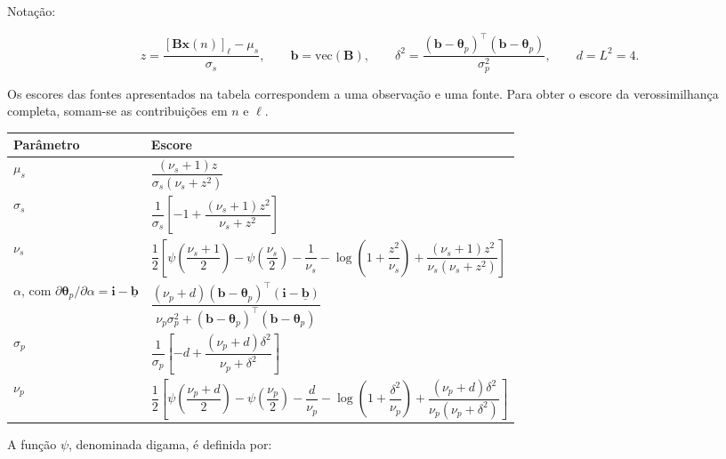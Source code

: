\documentclass[11pt]{article}
\newcounter{none}
\begin{document}
Notação:

\[z=\frac{[\mathbf B\mathbf x(n)]_\ell-\mu_s}{\sigma_s},
\qquad
\mathbf b=\mathrm{vec}(\mathbf B),
\qquad
\delta^2=
\frac{(\mathbf b-\boldsymbol\theta_p)^\top
(\mathbf b-\boldsymbol\theta_p)}{\sigma_p^2},
\qquad d=L^2=4.\]

Os escores das fontes apresentados na tabela correspondem a uma
observação e uma fonte. Para obter o escore da verossimilhança completa,
somam-se as contribuições em \(n\) e \(\ell\).

{\def\LTcaptype{none} %
\begin{longtable}[]{@{}
  >{\raggedright\arraybackslash}p{}
  >{\raggedright\arraybackslash}p{}@{}}
\toprule\noalign{}
\begin{minipage}[b]{\linewidth}\raggedright
Parâmetro
\end{minipage} & \begin{minipage}[b]{\linewidth}\raggedright
Escore
\end{minipage} \\
\midrule\noalign{}
\endhead
\bottomrule\noalign{}
\endlastfoot
\(\mu_s\) & \(\dfrac{(\nu_s+1)z}{\sigma_s(\nu_s+z^2)}\) \\
\(\sigma_s\) &
\(\dfrac{1}{\sigma_s}\left[-1+\dfrac{(\nu_s+1)z^2}{\nu_s+z^2}\right]\) \\
\(\nu_s\) &
\(\dfrac12\left[\psi\!\left(\dfrac{\nu_s+1}{2}\right)-\psi\!\left(\dfrac{\nu_s}{2}\right)-\dfrac1{\nu_s}-\log\!\left(1+\dfrac{z^2}{\nu_s}\right)+\dfrac{(\nu_s+1)z^2}{\nu_s(\nu_s+z^2)}\right]\) \\
\(\alpha\), com
\(\partial\boldsymbol\theta_p/\partial\alpha=\mathbf i-\underline{\mathbf b}\)
&
\(\dfrac{(\nu_p+d)(\mathbf b-\boldsymbol\theta_p)^\top(\mathbf i-\underline{\mathbf b})}{\nu_p\sigma_p^2+(\mathbf b-\boldsymbol\theta_p)^\top(\mathbf b-\boldsymbol\theta_p)}\) \\
\(\sigma_p\) &
\(\dfrac{1}{\sigma_p}\left[-d+\dfrac{(\nu_p+d)\delta^2}{\nu_p+\delta^2}\right]\) \\
\(\nu_p\) &
\(\dfrac12\left[\psi\!\left(\dfrac{\nu_p+d}{2}\right)-\psi\!\left(\dfrac{\nu_p}{2}\right)-\dfrac d{\nu_p}-\log\!\left(1+\dfrac{\delta^2}{\nu_p}\right)+\dfrac{(\nu_p+d)\delta^2}{\nu_p(\nu_p+\delta^2)}\right]\) \\
\end{longtable}
}

A função \(\psi\), denominada digama, é definida por:
\end{document}
